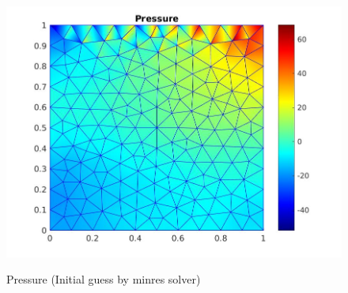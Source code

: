 \documentclass[a4paper]{book}
\begin{document}
\begin{figure}
\begin{minipage}[c]{0.3\textwidth}
  \label{y_vel_navier_stoke_minres_lid}
  \end{minipage}
  \begin{minipage}[c]{0.67\textwidth}
    \includegraphics[width=\textwidth]{lid_newton_pressure_minres.jpg}
  \end{minipage}\hfill
  \begin{minipage}[c]{0.3\textwidth}
    \caption{Pressure (Initial guess by minres solver)}
  \label{pressure_navier_stoke_minres_lid}
  \end{minipage}
\caption{\label{lid_driven_cavity_n_s_minres}}
\end{figure}
\end{document}
